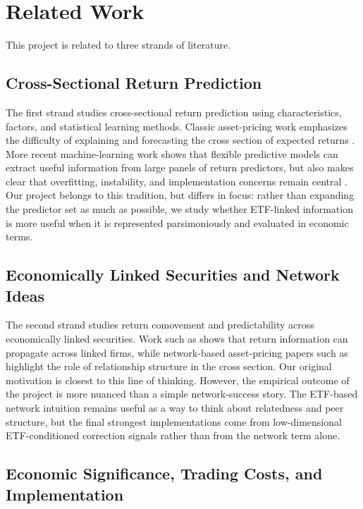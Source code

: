 \section{Related Work}
\label{sec:related}

This project is related to three strands of literature.

\subsection{Cross-Sectional Return Prediction}

The first strand studies cross-sectional return prediction using characteristics, factors, and statistical learning methods. Classic asset-pricing work emphasizes the difficulty of explaining and forecasting the cross section of expected returns \citep{fama1992cross}. More recent machine-learning work shows that flexible predictive models can extract useful information from large panels of return predictors, but also makes clear that overfitting, instability, and implementation concerns remain central \citep{gu2020empirical}. Our project belongs to this tradition, but differs in focus: rather than expanding the predictor set as much as possible, we study whether ETF-linked information is more useful when it is represented parsimoniously and evaluated in economic terms.

\subsection{Economically Linked Securities and Network Ideas}

The second strand studies return comovement and predictability across economically linked securities. Work such as \citet{cohen2008economic} shows that return information can propagate across linked firms, while network-based asset-pricing papers such as \citet{ahern2013network} highlight the role of relationship structure in the cross section. Our original motivation is closest to this line of thinking. However, the empirical outcome of the project is more nuanced than a simple network-success story. The ETF-based network intuition remains useful as a way to think about relatedness and peer structure, but the final strongest implementations come from low-dimensional ETF-conditioned correction signals rather than from the network term alone.

\subsection{Economic Significance, Trading Costs, and Implementation}

